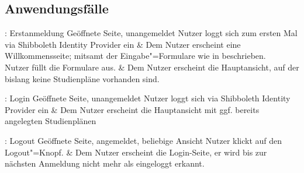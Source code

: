 \subsection{Anwendungsfälle}

\begin{comment}
	•Profil-Verwaltung
	  A10–A30, A40
	•Studienplan-Verwaltung
	  A50–A100
	•Modulnavigation
	  A110–130
	•Studienplan-Bearbeitung und Navigation
	  A140–A175, A200–A210, A215, A240
	•A220: Studienplan auf Korrektheit prüfen
	•A230: Studienplan vervollständigen lassen
\end{comment}

\begin{comment}
	\begin{center}
		\resizebox{\textwidth}{!} 
		{
			
		}
	\end{center}
\end{comment}

\begin{usecase}{: Erstanmeldung}
	{Geöffnete Seite, unangemeldet}
	Nutzer loggt sich zum ersten Mal via \gls{Shibboleth Identity Provider} ein
	& Dem Nutzer erscheint eine Willkommensseite; mitsamt der Eingabe"=Formulare wie in  beschrieben.\\ 
	\hline
	Nutzer füllt die Formulare aus.
	& Dem Nutzer erscheint die Hauptansicht, auf der bislang keine Studienpläne vorhanden sind. 	
\end{usecase}

\begin{usecase}{: Login}
	{Geöffnete Seite, unangemeldet}
	Nutzer loggt sich via \gls{Shibboleth Identity Provider} ein
	& Dem Nutzer erscheint die Hauptansicht mit ggf. bereits angelegten Studienplänen
\end{usecase}

\begin{usecase}{: Logout}
	{Geöffnete Seite, angemeldet, beliebige Ansicht}
	Nutzer klickt auf den Logout"=Knopf.
	& Dem Nutzer erscheint die Login-Seite, er wird bis zur nächsten Anmeldung nicht mehr als eingeloggt erkannt.
\end{usecase}


